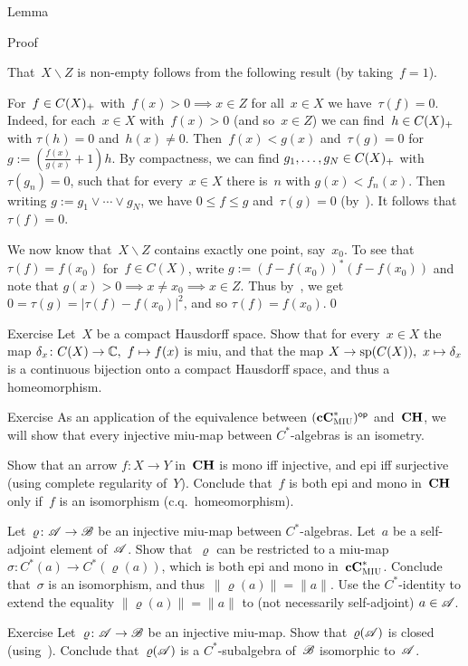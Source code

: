 \documentclass[a]{subfiles}
\begin{document}
\begin{parsec}
\begin{point}{Lemma}
\begin{point}{Proof}
\begin{point}
That~$X\backslash Z$ is non-empty
follows from the following result (by taking~$f=1$).
\end{point}
\begin{point}%
For~$f\in C(X)_{+}$
with~$f(x)> 0 \implies x\in Z$ for all~$x\in X$
we have~$\tau(f)=0$.
Indeed, for each~$x\in X$ with~$f(x)>0$
(and so~$x\in Z$)
we can find~$h\in C(X)_{+}$
with $\tau(h)=0$ and~$h(x)\neq 0$.
Then~$f(x)< g(x)$
and~$\tau(g)=0$
for $g:=(\frac{f(x)}{g(x)}+1)h$.
By compactness,
we can find $g_1,\dotsc,g_N\in C(X)_{+}$
with~$\tau(g_n)=0$,
such that for every~$x\in X$
there is~$n$ with $g(x)<f_n(x)$.
Then writing $g:=g_1\vee \dotsb \vee g_N$,
we have $0\leq f\leq g$ and~$\tau(g)=0$
(by~).
It follows that~$\tau(f)=0$.
\end{point}
\begin{point}%
We now know that~$X\backslash Z$ contains exactly
one point, say~$x_0$.
To see that~$\tau(f)=f(x_0)$
for~$f\in C(X)$,
write $g:=(f-f(x_0))^*(f-f(x_0))$
and note that $g(x)>0\implies x\neq x_0\implies  x\in Z$.
Thus by~,
we get $0=\tau(g)=\left|\tau(f)-f(x_0)\right|^2$,
and so $\tau(f)=f(x_0)$.\qed
\end{point}
\end{point}
\begin{point}{Exercise}%
Let~$X$ be a compact Hausdorff space.
Show that for every~$x\in X$
the map $\delta_x\colon C(X)\to \mathbb{C},\ f\mapsto f(x)$
is miu,
and that the map $X\to \mathrm{sp}(C(X)),\ x\mapsto \delta_x$
is a continuous bijection
onto a compact Hausdorff space,
and thus a homeomorphism.
\end{point}
\end{point}
\begin{point}{Exercise}%
As an application of the equivalence
between ${(\mathbf{cC}^*_{\text{\textsc{MIU}}})}{^{\mathsf{op}}}$
and~$\mathbf{CH}$,
we will show that every injective miu-map
between $C^*$-algebras
is an isometry.

Show that an arrow $f\colon X\to Y$
in~$\mathbf{CH}$ is mono iff injective, and epi iff surjective
(using complete regularity of~$Y$).
Conclude that~$f$ is both epi and mono in~$\mathbf{CH}$
only if~$f$ is an isomorphism (c.q.~homeomorphism).

Let~$\varrho\colon \mathscr{A}\to\mathscr{B}$
be an injective miu-map between $C^*$-algebras.
Let~$a$ be a self-adjoint element of~$\mathscr{A}$.
Show that~$\varrho$ can be restricted
to a miu-map $\sigma\colon C^*(a)\to C^*(\varrho(a))$,
which is both epi and mono in~$\mathbf{cC}^*_{\text{\textsc{MIU}}}$.
Conclude that~$\sigma$ is an isomorphism,
and thus~$\|\varrho(a)\|=\|a\|$.
Use the $C^*$-identity
to extend the equality $\|\varrho(a)\|=\|a\|$ 
to (not necessarily self-adjoint) $a\in \mathscr{A}$.
\end{point}
\begin{point}{Exercise}%
Let~$\varrho\colon \mathscr{A}\to\mathscr{B}$ 
be an injective miu-map.
Show that~$\varrho(\mathscr{A})$
is closed (using~).
Conclude that~$\varrho(\mathscr{A})$
is a
 $C^*$-subalgebra of~$\mathscr{B}$
isomorphic to~$\mathscr{A}$.
\end{point}
\end{parsec}
\end{document}
